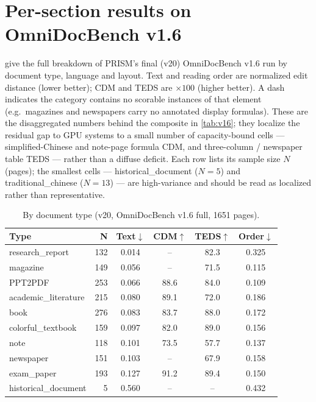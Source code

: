 \clearpage
\setcounter{page}{1}
\maketitlesupplementary

\section{Per-section results on OmniDocBench v1.6}
\label{sec:suppl_sections}

 give the full breakdown of PRISM's final (v20) OmniDocBench v1.6 run by document type, language and layout. Text and reading order are normalized edit distance (lower better); CDM and TEDS are $\times100$ (higher better). A dash indicates the category contains no scorable instances of that element (e.g.\ magazines and newspapers carry no annotated display formulas). These are the disaggregated numbers behind the composite in \cref{tab:v16}; they localize the residual gap to GPU systems to a small number of capacity-bound cells --- simplified-Chinese and note-page formula CDM, and three-column / newspaper table TEDS --- rather than a diffuse deficit. Each row lists its sample size $N$ (pages); the smallest cells --- historical\_document ($N{=}5$) and traditional\_chinese ($N{=}13$) --- are high-variance and should be read as localized rather than representative.

\begin{table}[h]
\centering
\caption{By document type (v20, OmniDocBench v1.6 full, 1651 pages).}
\label{tab:suppl_type}
\small
\setlength{\tabcolsep}{4pt}
\begin{tabular}{lrcccc}
\toprule
Type & N & Text$\downarrow$ & CDM$\uparrow$ & TEDS$\uparrow$ & Order$\downarrow$ \\
\midrule
research\_report     & 132 & 0.014 & --    & 82.3 & 0.325 \\
magazine             & 149 & 0.056 & --    & 71.5 & 0.115 \\
PPT2PDF              & 253 & 0.066 & 88.6  & 84.0 & 0.109 \\
academic\_literature & 215 & 0.080 & 89.1  & 72.0 & 0.186 \\
book                 & 276 & 0.083 & 83.7  & 88.0 & 0.172 \\
colorful\_textbook   & 159 & 0.097 & 82.0  & 89.0 & 0.156 \\
note                 & 118 & 0.101 & 73.5  & 57.7 & 0.137 \\
newspaper            & 151 & 0.103 & --    & 67.9 & 0.158 \\
exam\_paper          & 193 & 0.127 & 91.2  & 89.4 & 0.150 \\
historical\_document & 5 & 0.560 & --    & --   & 0.432 \\
\bottomrule
\end{tabular}
\end{table}

